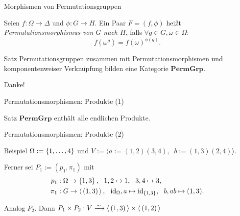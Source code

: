 \begin{frame}{Morphismen von Permutationsgruppen}

Seien $f : \Omega \to \Delta$ und $\phi : G \to H$.
Ein Paar $F = (f, \phi)$ heißt
\emph{Permutationsmorphismus von $G$ nach $H$},
falls
$\forall g \in G, \omega \in \Omega$:
\[
    f( \omega ^ g ) = f(\omega) ^ {\phi(g)}.
\]

\pause
\begin{block}{Satz}
Permutationsgruppen zusammen mit Permutationsmorphismen und komponentenweiser
Verknüpfung bilden eine Kategorie $\mathbf{PermGrp}$.
\end{block}
\end{frame}


\begin{frame}[standout]
Danke!
\end{frame}


\appendix
\begin{frame}{Permutationsmorphismen: Produkte (1)}
\begin{block}{Satz}
$\mathbf{PermGrp}$ enthält alle endlichen Produkte.
\end{block}
\end{frame}

\begin{frame}{Permutationsmorphismen: Produkte (2)}
\begin{block}{Beispiel}
$\Omega :=  \left\{ 1, \ldots, 4 \right\} $ und
$V := \langle a := (1,2)(3,4),~$%
$b := (1,3)(2,4) \rangle$.

\begin{figure}[H]
\centering
{}
\end{figure}

Ferner sei
$P_1 := (p_1, \pi_1)$ mit
\begin{align*}
p_1 &: \Omega \rightarrow  \left\{ 1,3 \right\} ,~~
1,2 \mapsto 1, ~~ 3,4 \mapsto 3,
\\
\pi_1 &: G \rightarrow  \left\langle \, (1,3) \, \right\rangle ,~~
\operatorname{id}_\Omega, a \mapsto \operatorname{id}_{ \left\{ 1,3 \right\} },
~~b, ab \mapsto (1,3).
\end{align*}

Analog $P_2$.
Dann $P_1 \times P_2 : V \iso \gen{(1,3)} \times \gen{(1,2)}$
\end{block}
\end{frame}

